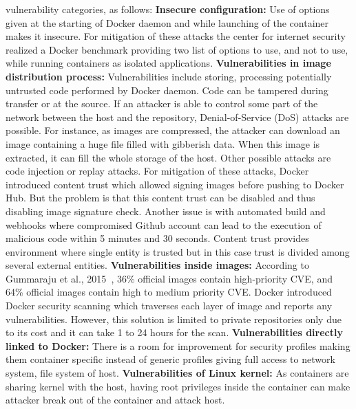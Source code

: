 vulnerability categories, as follows:
\newline
\newline
\textbf{Insecure configuration:} Use of options given at the starting of Docker daemon 
and while launching of the container makes it insecure. For mitigation of these 
attacks the center for internet security realized a Docker benchmark providing 
two list of options to use, and not to use, while running containers as isolated 
applications.
\newline
\newline
\textbf{Vulnerabilities in image distribution process:} Vulnerabilities include storing, 
processing potentially untrusted code performed by Docker daemon. Code can be 
tampered during transfer or at the source.
If an attacker is able to control some part of the
network between the host and the repository, Denial-of-Service (DoS) attacks are
possible. For instance, as images are compressed, the attacker can
download an image containing a huge file filled with gibberish data.
When this image is extracted, it can fill the whole storage of the host.
Other possible attacks are code injection or replay attacks. 
For mitigation of these attacks, Docker introduced content trust which allowed 
signing images before pushing to Docker Hub. But the problem is that this content 
trust can be disabled and thus disabling image signature check. Another issue is 
with automated build and webhooks where compromised Github account can lead to the 
execution of malicious code within 5 minutes and 30 seconds. Content trust provides 
environment where single entity is trusted but in this case trust is divided among 
several external entities.
\newline
\newline
\textbf{Vulnerabilities inside images:} According to Gummaraju et al., 
2015~\cite{gummaraju2015over}, 36\% official images 
contain high-priority CVE, and 64\% official images contain high to medium priority CVE. Docker 
introduced Docker security scanning which traverses each layer of image and reports 
any vulnerabilities. However, this solution is limited to private repositories only due to 
its cost and it can take 1 to 24 hours for the scan.
\newline
\newline
\textbf{Vulnerabilities directly linked to Docker:} There is a room for improvement for security
profiles making them container specific instead of generic profiles giving full access 
to network system, file system of host.
\newline
\newline
\textbf{Vulnerabilities of Linux kernel:} As containers are sharing kernel with the host, having
root privileges inside the container can make attacker break out of the container and 
attack host.

